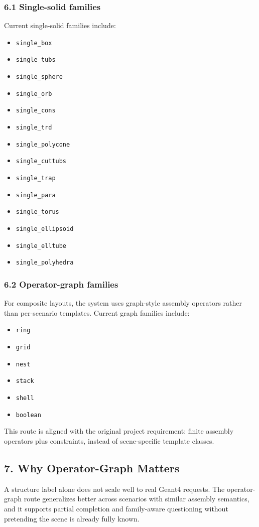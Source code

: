 \documentclass[11pt,a4paper]{ctexart}
\begin{document}
\subsubsection*{6.1 Single-solid families}
Current single-solid families include:
\begin{itemize}
\item \texttt{single\_box}
\item \texttt{single\_tubs}
\item \texttt{single\_sphere}
\item \texttt{single\_orb}
\item \texttt{single\_cons}
\item \texttt{single\_trd}
\item \texttt{single\_polycone}
\item \texttt{single\_cuttubs}
\item \texttt{single\_trap}
\item \texttt{single\_para}
\item \texttt{single\_torus}
\item \texttt{single\_ellipsoid}
\item \texttt{single\_elltube}
\item \texttt{single\_polyhedra}
\end{itemize}
\subsubsection*{6.2 Operator-graph families}
For composite layouts, the system uses graph-style assembly operators rather than per-scenario templates. Current graph families include:
\begin{itemize}
\item \texttt{ring}
\item \texttt{grid}
\item \texttt{nest}
\item \texttt{stack}
\item \texttt{shell}
\item \texttt{boolean}
\end{itemize}
This route is aligned with the original project requirement: finite assembly operators plus constraints, instead of scene-specific template classes.
\subsection*{7. Why Operator-Graph Matters}
A structure label alone does not scale well to real Geant4 requests. The operator-graph route generalizes better across scenarios with similar assembly semantics, and it supports partial completion and family-aware questioning without pretending the scene is already fully known.
\end{document}
